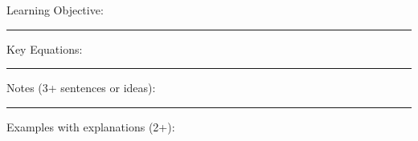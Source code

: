 \documentclass{article}
\theoremstyle{plain}
\theoremstyle{definition}
\theoremstyle{remark}
\begin{document}
\vskip-2pt
\noindent \large Learning Objective:
\normalsize
\vskip1in
\hrule
\vspace{0.1in}
\large \noindent Key Equations:
\normalsize

\vspace{1in}
\hrule
\vspace{0.1in}
\large \noindent Notes (3+ sentences or ideas):
\normalsize
\vspace{1.75in}
\hrule
\vspace{0.1in}

\large \noindent Examples with explanations (2+):
%
%
%
%
%
%
%
%
%
%
%
\end{document}
